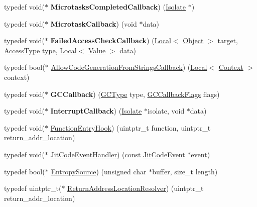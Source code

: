\begin{DoxyCompactItemize}
\item 
typedef void($\ast$ {\bfseries Microtasks\+Completed\+Callback}) (\hyperlink{classv8_1_1_isolate}{Isolate} $\ast$)\hypertarget{namespacev8_af193f756612950a896e140052cf17a42}{}\label{namespacev8_af193f756612950a896e140052cf17a42}

\item 
typedef void($\ast$ {\bfseries Microtask\+Callback}) (void $\ast$data)\hypertarget{namespacev8_a64445c32058729cdc44d56ff13458bed}{}\label{namespacev8_a64445c32058729cdc44d56ff13458bed}

\item 
typedef void($\ast$ {\bfseries Failed\+Access\+Check\+Callback}) (\hyperlink{classv8_1_1_local}{Local}$<$ \hyperlink{classv8_1_1_object}{Object} $>$ target, \hyperlink{namespacev8_add8bef6469c5b94706584124e610046c}{Access\+Type} type, \hyperlink{classv8_1_1_local}{Local}$<$ \hyperlink{classv8_1_1_value}{Value} $>$ data)\hypertarget{namespacev8_a1352a0d6e487b7092ea79e2d3d4ecd12}{}\label{namespacev8_a1352a0d6e487b7092ea79e2d3d4ecd12}

\item 
typedef bool($\ast$ \hyperlink{namespacev8_a521d909ec201742a1cb35d50a8e2a3c2}{Allow\+Code\+Generation\+From\+Strings\+Callback}) (\hyperlink{classv8_1_1_local}{Local}$<$ \hyperlink{classv8_1_1_context}{Context} $>$ context)
\item 
typedef void($\ast$ {\bfseries G\+C\+Callback}) (\hyperlink{namespacev8_ac109d6f27e0c0f9ef4e98bcf7a806cf2}{G\+C\+Type} type, \hyperlink{namespacev8_a247c37a849f4d6c293b9b16e94e1944b}{G\+C\+Callback\+Flags} flags)\hypertarget{namespacev8_aa789d9f0935eb32c27ec05e0f818a6c4}{}\label{namespacev8_aa789d9f0935eb32c27ec05e0f818a6c4}

\item 
typedef void($\ast$ {\bfseries Interrupt\+Callback}) (\hyperlink{classv8_1_1_isolate}{Isolate} $\ast$isolate, void $\ast$data)\hypertarget{namespacev8_af07fcf2ef61237b7ba67242700b6a875}{}\label{namespacev8_af07fcf2ef61237b7ba67242700b6a875}

\item 
typedef void($\ast$ \hyperlink{namespacev8_aaf07fb6bb13f295da3c6568938b7dec5}{Function\+Entry\+Hook}) (uintptr\+\_\+t function, uintptr\+\_\+t return\+\_\+addr\+\_\+location)
\item 
typedef void($\ast$ \hyperlink{namespacev8_a39243bc91e63d64d111452fdb98c4733}{Jit\+Code\+Event\+Handler}) (const \hyperlink{structv8_1_1_jit_code_event}{Jit\+Code\+Event} $\ast$event)
\item 
typedef bool($\ast$ \hyperlink{namespacev8_ab699f4bbbb56350e6e915682e420fcdc}{Entropy\+Source}) (unsigned char $\ast$buffer, size\+\_\+t length)
\item 
typedef uintptr\+\_\+t($\ast$ \hyperlink{namespacev8_a8ce54c75241be41ff6a25e9944eefd2a}{Return\+Address\+Location\+Resolver}) (uintptr\+\_\+t return\+\_\+addr\+\_\+location)
\end{DoxyCompactItemize}
